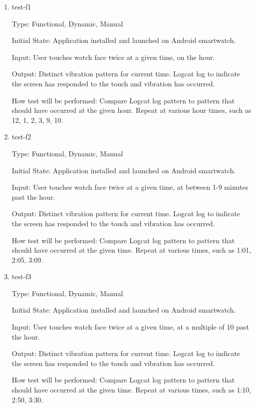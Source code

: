 \begin{enumerate}

\item{test-f1\\}

Type: Functional, Dynamic, Manual
					
Initial State: Application installed and launched on Android smartwatch. 
					
Input: User touches watch face twice at a given time, on the hour.
					
Output: Distinct vibration pattern for current time. Logcat log to indicate the screen has responded to the touch and vibration has occurred.  
					
How test will be performed: Compare Logcat log pattern to pattern that should have occurred at the given hour. Repeat at various hour times, such as 12, 1, 2, 3, 9, 10. 
					
\item{test-f2\\}

Type: Functional, Dynamic, Manual
					
Initial State: Application installed and launched on Android smartwatch. 
					
Input: User touches watch face twice at a given time, at between 1-9 minutes past the hour.
					
Output: Distinct vibration pattern for current time. Logcat log to indicate the screen has responded to the touch and vibration has occurred.  
					
How test will be performed: Compare Logcat log pattern to pattern that should have occurred at the given time. Repeat at various times, such as 1:01, 2:05, 3:09. 

\item{test-f3\\}

Type: Functional, Dynamic, Manual
					
Initial State: Application installed and launched on Android smartwatch. 
					
Input: User touches watch face twice at a given time, at a multiple of 10 past the hour.
					
Output: Distinct vibration pattern for current time. Logcat log to indicate the screen has responded to the touch and vibration has occurred.  
					
How test will be performed: Compare Logcat log pattern to pattern that should have occurred at the given time. Repeat at various times, such as 1:10, 2:50, 3:30. 


\end{enumerate}
